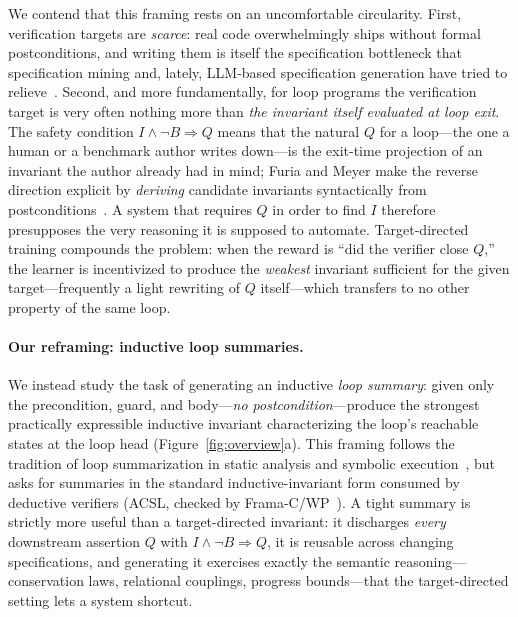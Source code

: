 We contend that this framing rests on an uncomfortable circularity.
First, verification targets are \emph{scarce}: real code overwhelmingly ships without formal postconditions, and writing them is itself the specification bottleneck that specification mining and, lately, LLM-based specification generation have tried to relieve~\citep{daikon,endres2024can,ma2024specgen,wen2024enchanting}.
Second, and more fundamentally, for loop programs the verification target is very often nothing more than \emph{the invariant itself evaluated at loop exit}.
The safety condition $I \wedge \neg B \Rightarrow Q$ means that the natural $Q$ for a loop---the one a human or a benchmark author writes down---is the exit-time projection of an invariant the author already had in mind; Furia and Meyer make the reverse direction explicit by \emph{deriving} candidate invariants syntactically from postconditions~\citep{furia2010inferring}.
A system that requires $Q$ in order to find $I$ therefore presupposes the very reasoning it is supposed to automate.
Target-directed training compounds the problem: when the reward is ``did the verifier close $Q$,'' the learner is incentivized to produce the \emph{weakest} invariant sufficient for the given target---frequently a light rewriting of $Q$ itself---which transfers to no other property of the same loop.

\paragraph{Our reframing: inductive loop summaries.}
We instead study the task of generating an inductive \emph{loop summary}: given only the precondition, guard, and body---\emph{no postcondition}---produce the strongest practically expressible inductive invariant characterizing the loop's reachable states at the loop head (Figure~\ref{fig:overview}a).
This framing follows the tradition of loop summarization in static analysis and symbolic execution~\citep{kroening2008loop,godefroid2011automatic,xie2016proteus,farzan2015compositional,kincaid2017compositional}, but asks for summaries in the standard inductive-invariant form consumed by deductive verifiers (ACSL, checked by Frama-C/WP~\citep{framac,acsl}).
A tight summary is strictly more useful than a target-directed invariant: it discharges \emph{every} downstream assertion $Q$ with $I \wedge \neg B \Rightarrow Q$, it is reusable across changing specifications, and generating it exercises exactly the semantic reasoning---conservation laws, relational couplings, progress bounds---that the target-directed setting lets a system shortcut.

